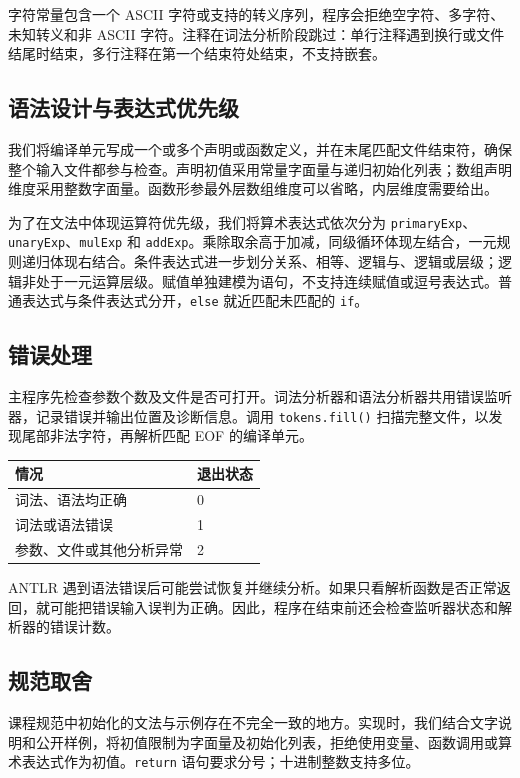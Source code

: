 \documentclass[UTF8,a4paper,11pt]{ctexart}
\begin{document}
字符常量包含一个 ASCII 字符或支持的转义序列，程序会拒绝空字符、多字符、未知转义和非 ASCII 字符。注释在词法分析阶段跳过：单行注释遇到换行或文件结尾时结束，多行注释在第一个结束符处结束，不支持嵌套。

\subsection{语法设计与表达式优先级}
我们将编译单元写成一个或多个声明或函数定义，并在末尾匹配文件结束符，确保整个输入文件都参与检查。声明初值采用常量字面量与递归初始化列表；数组声明维度采用整数字面量。函数形参最外层数组维度可以省略，内层维度需要给出。

为了在文法中体现运算符优先级，我们将算术表达式依次分为 \texttt{primaryExp}、\texttt{unaryExp}、\texttt{mulExp} 和 \texttt{addExp}。乘除取余高于加减，同级循环体现左结合，一元规则递归体现右结合。条件表达式进一步划分关系、相等、逻辑与、逻辑或层级；逻辑非处于一元运算层级。赋值单独建模为语句，不支持连续赋值或逗号表达式。普通表达式与条件表达式分开，\texttt{else} 就近匹配未匹配的 \texttt{if}。

\subsection{错误处理}
主程序先检查参数个数及文件是否可打开。词法分析器和语法分析器共用错误监听器，记录错误并输出位置及诊断信息。调用 \texttt{tokens.fill()} 扫描完整文件，以发现尾部非法字符，再解析匹配 EOF 的编译单元。

\begin{center}
\begin{tabular}{ll}
\toprule
情况 & 退出状态\\
\midrule
词法、语法均正确 & 0\\
词法或语法错误 & 1\\
参数、文件或其他分析异常 & 2\\
\bottomrule
\end{tabular}
\end{center}
ANTLR 遇到语法错误后可能尝试恢复并继续分析。如果只看解析函数是否正常返回，就可能把错误输入误判为正确。因此，程序在结束前还会检查监听器状态和解析器的错误计数。

\subsection{规范取舍}
课程规范中初始化的文法与示例存在不完全一致的地方。实现时，我们结合文字说明和公开样例，将初值限制为字面量及初始化列表，拒绝使用变量、函数调用或算术表达式作为初值。\texttt{return} 语句要求分号；十进制整数支持多位。
\end{document}
